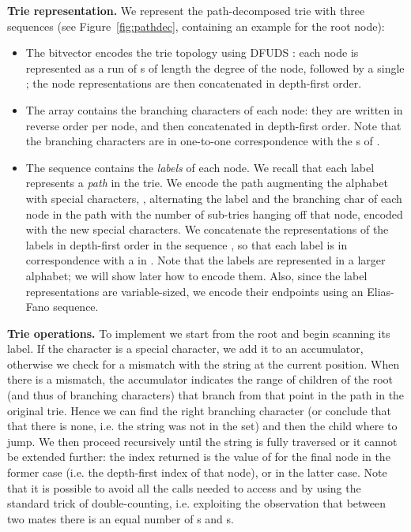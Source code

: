 \documentclass[a4paper,11pt]{article}
\newcommand{\shrinkitems}{\setlength{\itemsep}{0ex}} \newcommand{\sshrinkitems}{\setlength{\itemsep}{-1ex}} \newcommand{\shrinktable}{\setlength{\abovecaptionskip}{-1ex}\setlength{\belowcaptionskip}{-1ex}}
\newcommand{\ttlpar}[1]{\noindent\textbf{#1}}
\theoremstyle{nonumberplain}
\begin{document}
\ttlpar{Trie representation.} 
We represent the path-decomposed trie with three sequences (see
Figure~\ref{fig:pathdec}, containing an example for the root node):
\begin{itemize}\shrinkitems
\item The bitvector  encodes the trie topology using DFUDS
  \cite{dfuds}: each node is represented as a run of s of
  length the degree of the node, followed by a single ; the
  node representations are then concatenated in depth-first order.
\item The array  contains the branching characters of each node:
  they are written in reverse order per node, and then concatenated in
  depth-first order. Note that the branching characters are in
  one-to-one correspondence with the s of .
\item The sequence  contains the \emph{labels} of each node. We
  recall that each label represents a \emph{path} in the trie. We
  encode the path augmenting the alphabet  with 
  special characters, , alternating the label and the
  branching char of each node in the path with the number of sub-tries
  hanging off that node, encoded with the new special characters. We
  concatenate the representations of the labels in depth-first order
  in the sequence , so that each label is in correspondence with a
   in . Note that the labels are represented in a
  larger alphabet; we will show later how to encode them. Also, since the
  label representations are variable-sized, we encode their endpoints
  using an Elias-Fano sequence.
\end{itemize}

\ttlpar{Trie operations.} 
To implement  we start from the root and begin scanning its
label. If the character is a special character, we add it to an
accumulator, otherwise we check for a mismatch with the string at the
current position. When there is a mismatch, the accumulator indicates
the range of children of the root (and thus of branching characters)
that branch from that point in the path in the original trie. Hence we
can find the right branching character (or conclude that that there is
none, i.e. the string was not in the set) and then the child where to
jump. We then proceed recursively until the string is fully traversed
or it cannot be extended further: the index returned is the value of
 for the final node in the former case (i.e.\mbox{}
the depth-first index of that node), or  in the latter
case. Note that it is possible to avoid all the  calls needed
to access  and  by using the standard trick of double-counting,
i.e. exploiting the observation that between two mates there is an equal
number of s and s.
\end{document}
